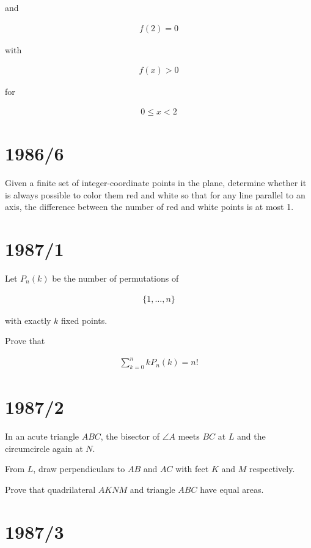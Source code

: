 \documentclass[12pt]{article}
\begin{document}
and

\begin{align*}
f(2)=0
\end{align*}

with

\begin{align*}
f(x)>0
\end{align*}

for

\begin{align*}
0\leq x<2
\end{align*}

\section*{1986/6}

Given a finite set of integer-coordinate points in the plane, determine whether it is always possible to color them red and white so that for any line parallel to an axis, the difference between the number of red and white points is at most 1.

\section*{1987/1}

Let $P_n(k)$ be the number of permutations of

\begin{align*}
\{1,\dots,n\}
\end{align*}

with exactly $k$ fixed points.

Prove that

\begin{align*}
\sum_{k=0}^{n} kP_n(k)=n!
\end{align*}

\section*{1987/2}

In an acute triangle $ABC$, the bisector of $\angle A$ meets $BC$ at $L$ and the circumcircle again at $N$.

From $L$, draw perpendiculars to $AB$ and $AC$ with feet $K$ and $M$ respectively.

Prove that quadrilateral $AKNM$ and triangle $ABC$ have equal areas.

\section*{1987/3}
\end{document}
